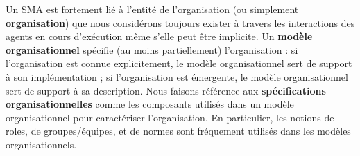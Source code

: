 \documentclass[contribution]{jfsma}
\begin{document}


Un SMA est fortement lié à l'entité de l'organisation (ou simplement \textbf{organisation}) que nous considérons toujours exister à travers les interactions des agents en cours d'exécution même s'elle peut être implicite.
%
%
Un \textbf{modèle organisationnel} spécifie (au moins partiellement) l'organisation : si l'organisation est connue explicitement, le modèle organisationnel sert de support à son implémentation ; si l'organisation est émergente, le modèle organisationnel sert de support à sa description. Nous faisons référence aux \textbf{spécifications organisationnelles} comme les composants utilisés dans un modèle organisationnel pour caractériser l'organisation.
En particulier, les notions de roles, de groupes/équipes, et de normes sont fréquement utilisés dans les modèles organisationnels.
\end{document}
